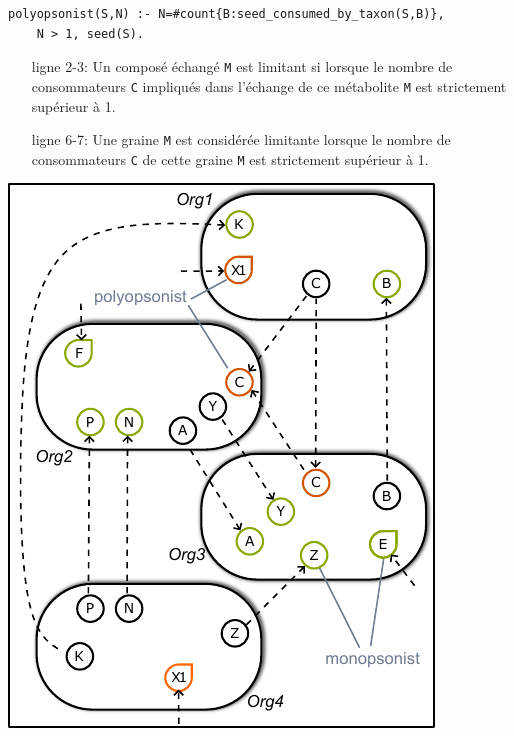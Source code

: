 \documentclass[8pt]{beamer}
\begin{document}
\begin{frame}[fragile]
\begin{onlyenv}
\begin{minipage}{0.5\textwidth}
\begin{lstlisting}[mathescape=True,label={lst:competition}, captionpos=b]
% cas pour les graines
polyopsonist(S,N) :- N=#count{B:seed_consumed_by_taxon(S,B)}, 
	N > 1, seed(S).
\end{lstlisting}
\begin{itemize}
	\item[ligne 2-3:] Un composé échangé \texttt{M} est limitant si lorsque le nombre de consommateurs \texttt{C} impliqués dans l'échange de ce métabolite \texttt{M} est strictement supérieur à 1.
	\item[ligne 6-7:] Une graine \texttt{M} est considérée limitante lorsque le nombre de consommateurs \texttt{C} de cette graine \texttt{M} est strictement supérieur à 1. \\
\end{itemize}
\end{minipage}%
\hspace{0.25cm}
\hfill
\begin{minipage}{0.45\textwidth}
\includegraphics[width=\textwidth]{figures/poly-monoopsonie.pdf}
\end{minipage}
\end{onlyenv}
\end{frame}
\end{document}

